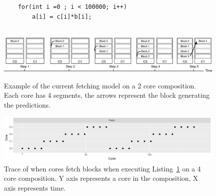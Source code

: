 


\begin{figure}[t]
\lstset{language=C,numbersep=4pt}
\begin{center}
\begin{lstlisting}
	for(int i =0 ; i < 100000; i++)
		a[i] = c[i]*b[i];
	
\end{lstlisting}
\end{center}
\vspace{-1em}
\label{lst:basic}
\vspace{-1em}
\end{figure}

\begin{figure}[t]
    \centering
    \includegraphics[width=1\textwidth]{chapter3/graphics/normfetch.pdf}
    \caption{Example of the current fetching model on a 2 core composition. Each core has 4 segments, the arrows represent the block generating the predictions.}
    \label{fig:old_fetch}
\vspace{1em}
    \centering
    \includegraphics[width=1\textwidth]{chapter3/graphics/4fetchnorm2.pdf}
    \caption{Trace of when cores fetch blocks when executing Listing~\ref{lst:basic} on a 4 core composition. Y axis represents a core in the composition, X axis represents time.}
    \label{fig:fetch_norm}
\vspace{1em}
\end{figure}
